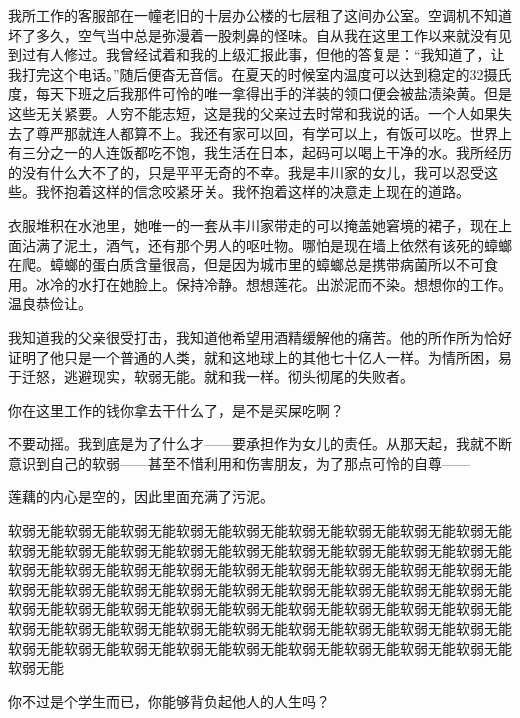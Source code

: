\documentclass{article}
\begin{document}
我所工作的客服部在一幢老旧的十层办公楼的七层租了这间办公室。空调机不知道坏了多久，空气当中总是弥漫着一股刺鼻的怪味。自从我在这里工作以来就没有见到过有人修过。我曾经试着和我的上级汇报此事，但他的答复是：“我知道了，让我打完这个电话。”随后便杳无音信。在夏天的时候室内温度可以达到稳定的32摄氏度，每天下班之后我那件可怜的唯一拿得出手的洋装的领口便会被盐渍染黄。但是这些无关紧要。人穷不能志短，这是我的父亲过去时常和我说的话。一个人如果失去了尊严那就连人都算不上。我还有家可以回，有学可以上，有饭可以吃。世界上有三分之一的人连饭都吃不饱，我生活在日本，起码可以喝上干净的水。我所经历的没有什么大不了的，只是平平无奇的不幸。我是丰川家的女儿，我可以忍受这些。我怀抱着这样的信念咬紧牙关。我怀抱着这样的决意走上现在的道路。



衣服堆积在水池里，她唯一的一套从丰川家带走的可以掩盖她窘境的裙子，现在上面沾满了泥土，酒气，还有那个男人的呕吐物。哪怕是现在墙上依然有该死的蟑螂在爬。蟑螂的蛋白质含量很高，但是因为城市里的蟑螂总是携带病菌所以不可食用。冰冷的水打在她脸上。保持冷静。想想莲花。出淤泥而不染。想想你的工作。温良恭俭让。



我知道我的父亲很受打击，我知道他希望用酒精缓解他的痛苦。他的所作所为恰好证明了他只是一个普通的人类，就和这地球上的其他七十亿人一样。为情所困，易于迁怒，逃避现实，软弱无能。就和我一样。彻头彻尾的失败者。



你在这里工作的钱你拿去干什么了，是不是买屎吃啊？



不要动摇。我到底是为了什么才——要承担作为女儿的责任。从那天起，我就不断意识到自己的软弱——甚至不惜利用和伤害朋友，为了那点可怜的自尊——



莲藕的内心是空的，因此里面充满了污泥。



软弱无能软弱无能软弱无能软弱无能软弱无能软弱无能软弱无能软弱无能软弱无能软弱无能软弱无能软弱无能软弱无能软弱无能软弱无能软弱无能软弱无能软弱无能软弱无能软弱无能软弱无能软弱无能软弱无能软弱无能软弱无能软弱无能软弱无能软弱无能软弱无能软弱无能软弱无能软弱无能软弱无能软弱无能软弱无能软弱无能软弱无能软弱无能软弱无能软弱无能软弱无能软弱无能软弱无能软弱无能软弱无能软弱无能软弱无能软弱无能软弱无能软弱无能软弱无能软弱无能软弱无能软弱无能软弱无能软弱无能软弱无能软弱无能软弱无能软弱无能软弱无能软弱无能软弱无能软弱无能



你不过是个学生而已，你能够背负起他人的人生吗？
\end{document}
